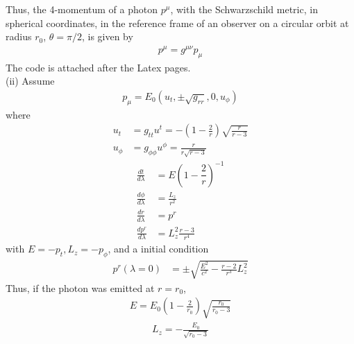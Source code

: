 \documentclass[12pt]{article}
\begin{document}
Thus, the 4-momentum of a photon $p^{\mu}$, with the Schwarzschild metric, in spherical coordinates, in the reference frame of an observer on a circular orbit at radius $r_0$, $\theta = \pi/2$, is given by
\begin{align}
p^{\mu} = g^{\mu \nu} p_{\mu}
\end{align}
The code is attached after the Latex pages.\\
(ii)
Assume
\begin{align}
p_{\mu} = E_0 \left(u_t, \pm \sqrt{g_{rr}}, 0, u_{\phi} \right)
\end{align}
where
\begin{align}
u_t &= g_{tt} u^{t} = - \left(1 - \frac{2}{r}\right) \sqrt{\frac{r}{r - 3}}\\
u_{\phi} &= g_{\phi \phi} u^{\phi} = \frac{r}{r \sqrt{r - 3}}
\end{align}
\begin{align}
\frac{dt}{d\lambda} &= E \left(1 - \dfrac{2}{r}\right)^{-1}\\
\frac{d\phi}{d\lambda} &= \frac{L_z}{r^2}\\
\frac{dr}{d\lambda} &= p^{r}\\
\frac{dp^{r}}{d\lambda} &= L_z^2 \frac{r - 3}{r^4}
\end{align}
with $E = - p_t, L_z = - p_\phi$, and a initial condition
\begin{align}
p^{r}(\lambda=0) &= \pm \sqrt{\frac{E^2}{c^2} - \frac{r - 2}{r^3} L_z^2}
\end{align}
Thus, if the photon was emitted at $r = r_0$,
\begin{gather}
E = E_0 \left(1 - \frac{2}{r_0}\right) \sqrt{\frac{r_0}{r_0 - 3}}
\end{gather}
\begin{gather}
L_z = - \frac{E_0}{\sqrt{r_0 - 3}}
\end{gather}
\end{document}

